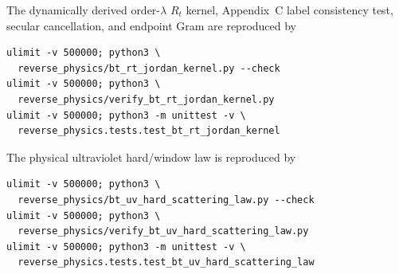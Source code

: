 \documentclass[11pt]{article}
\theoremstyle{definition}
\theoremstyle{remark}
\begin{document}
The dynamically derived order-$\lambda$ $R_t$ kernel, Appendix~C label
consistency test, secular cancellation, and endpoint Gram are reproduced by
\begin{verbatim}
ulimit -v 500000; python3 \
  reverse_physics/bt_rt_jordan_kernel.py --check
ulimit -v 500000; python3 \
  reverse_physics/verify_bt_rt_jordan_kernel.py
ulimit -v 500000; python3 -m unittest -v \
  reverse_physics.tests.test_bt_rt_jordan_kernel
\end{verbatim}

The physical ultraviolet hard/window law is reproduced by
\begin{verbatim}
ulimit -v 500000; python3 \
  reverse_physics/bt_uv_hard_scattering_law.py --check
ulimit -v 500000; python3 \
  reverse_physics/verify_bt_uv_hard_scattering_law.py
ulimit -v 500000; python3 -m unittest -v \
  reverse_physics.tests.test_bt_uv_hard_scattering_law
\end{verbatim}
\end{document}
